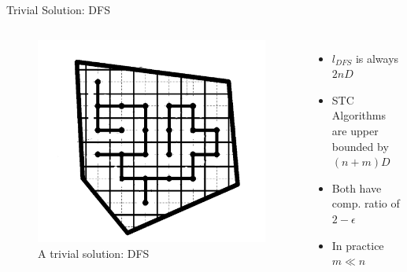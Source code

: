 \documentclass{beamer}
\begin{document}
\begin{frame}{Trivial Solution: DFS}
    \begin{columns}
        \begin{figure}
            \includegraphics[width=\linewidth]{Images/DFS.png}
            \caption{A trivial solution: DFS}
        \end{figure}
        \begin{itemize}
            \item $l_{DFS}$ is always $2nD$
            \item STC Algorithms are upper bounded by $(n + m) D$
            \item Both have comp. ratio of $2 - \epsilon$
            \item In practice $m \ll n$
        \end{itemize}
    \end{columns}
\end{frame}



\end{document}
